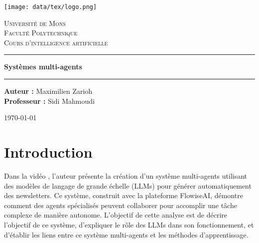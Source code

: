 \documentclass[a4paper,12pt]{article}
\begin{document}
	
	\begin{titlepage}
		\begin{center}
			\texttt{[image: data/tex/logo.png]}\vspace{1cm}
			
			\textsc{\LARGE Université de Mons} \vspace{0.5cm}\\
			\textsc{\Large Faculté Polytechnique} \vspace{1.5cm}\\
			\textsc{\large Cours d'intelligence artificielle} \vspace{2cm}
			
			\hrule height 0.5mm \vspace{0.4cm}
			{\Huge \bfseries Systèmes multi-agents} \vspace{0.4cm}
			\hrule height 0.5mm \vspace{1.5cm}
			
			\begin{minipage}{0.8\textwidth}
				\begin{flushleft} \large
					\textbf{Auteur :} Maximilien Zarioh \\[0.2cm]
					\textbf{Professeur :} Sidi Mahmoudi
				\end{flushleft}
			\end{minipage}
			
			\vfill
			\large \today
		\end{center}
	\end{titlepage}
	
	\tableofcontents
	\newpage
	
	\section{Introduction}
	Dans la vidéo \cite{youtube_video}, l'auteur présente la création d'un système multi-agents utilisant des modèles de langage de grande échelle (LLMs) pour générer automatiquement des newsletters. Ce système, construit avec la plateforme FlowiseAI, démontre comment des agents spécialisés peuvent collaborer pour accomplir une tâche complexe de manière autonome. L'objectif de cette analyse est de décrire l'objectif de ce système, d'expliquer le rôle des LLMs dans son fonctionnement, et d'établir les liens entre ce système multi-agents et les méthodes d'apprentissage.
	
\end{document}
